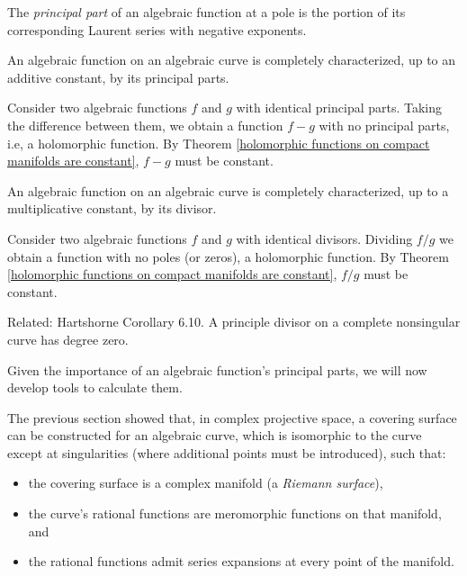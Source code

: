 \endtheorem

The {\it principal part} of an algebraic function at a pole is the
portion of its corresponding Laurent series with negative exponents.
\enddefinition

\theorem
\label{algebraic functions are characterized by their principal parts}

An algebraic function on an algebraic curve is completely characterized, up to an additive
constant, by its principal parts.

\proof

Consider two algebraic functions $f$ and $g$ with identical principal
parts.  Taking the difference between them, we obtain a function $f-g$
with no principal parts, i.e, a holomorphic function.  By
Theorem \ref{holomorphic functions on compact manifolds are constant},
$f-g$ must be constant.

\endtheorem

\theorem
\label{algebraic functions are characterized by their divisors}

An algebraic function on an algebraic curve is completely characterized, up to a multiplicative
constant, by its divisor.

\proof

Consider two algebraic functions $f$ and $g$ with identical divisors.
Dividing $f/g$ we obtain a function with no poles (or zeros),
a holomorphic function.  By
Theorem \ref{holomorphic functions on compact manifolds are constant},
$f/g$ must be constant.

\endtheorem

Related: Hartshorne Corollary 6.10. A principle divisor on a complete
nonsingular curve has degree zero.

Given the importance of an algebraic function's principal parts, we will
now develop tools to calculate them.

\vfill\eject


The previous section showed that, in complex projective space,
a covering surface can be constructed for an algebraic curve,
which is isomorphic to the curve except at singularities
(where additional points must be introduced), such that:
\begin{itemize}
\item the covering surface is a complex manifold (a {\it Riemann surface}),
\item the curve's rational functions are meromorphic functions
on that manifold, and
\item the rational functions admit series expansions at
every point of the manifold.
\end{itemize}

